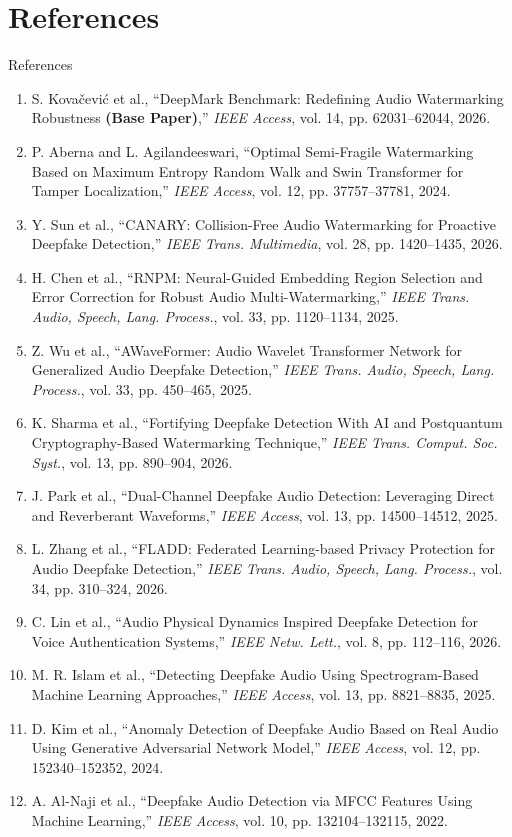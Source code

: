 \documentclass[10pt, aspectratio=169]{beamer}
\begin{document}
\section{References}
\begin{frame}{References}
  \fontsize{5.5pt}{7pt}\selectfont
  \setlength{\leftmargini}{1.2em}
  \begin{enumerate}
    \setlength{\itemsep}{1.5pt}
    \setlength{\parskip}{0pt}
    \item S. Kova\v{c}evi\'c et al., ``DeepMark Benchmark: Redefining Audio Watermarking Robustness \textbf{(Base Paper)},'' \textit{IEEE Access}, vol. 14, pp. 62031--62044, 2026.
    \item P. Aberna and L. Agilandeeswari, ``Optimal Semi-Fragile Watermarking Based on Maximum Entropy Random Walk and Swin Transformer for Tamper Localization,'' \textit{IEEE Access}, vol. 12, pp. 37757--37781, 2024.
    \item Y. Sun et al., ``CANARY: Collision-Free Audio Watermarking for Proactive Deepfake Detection,'' \textit{IEEE Trans. Multimedia}, vol. 28, pp. 1420--1435, 2026.
    \item H. Chen et al., ``RNPM: Neural-Guided Embedding Region Selection and Error Correction for Robust Audio Multi-Watermarking,'' \textit{IEEE Trans. Audio, Speech, Lang. Process.}, vol. 33, pp. 1120--1134, 2025.
    \item Z. Wu et al., ``AWaveFormer: Audio Wavelet Transformer Network for Generalized Audio Deepfake Detection,'' \textit{IEEE Trans. Audio, Speech, Lang. Process.}, vol. 33, pp. 450--465, 2025.
    \item K. Sharma et al., ``Fortifying Deepfake Detection With AI and Postquantum Cryptography-Based Watermarking Technique,'' \textit{IEEE Trans. Comput. Soc. Syst.}, vol. 13, pp. 890--904, 2026.
    \item J. Park et al., ``Dual-Channel Deepfake Audio Detection: Leveraging Direct and Reverberant Waveforms,'' \textit{IEEE Access}, vol. 13, pp. 14500--14512, 2025.
    \item L. Zhang et al., ``FLADD: Federated Learning-based Privacy Protection for Audio Deepfake Detection,'' \textit{IEEE Trans. Audio, Speech, Lang. Process.}, vol. 34, pp. 310--324, 2026.
    \item C. Lin et al., ``Audio Physical Dynamics Inspired Deepfake Detection for Voice Authentication Systems,'' \textit{IEEE Netw. Lett.}, vol. 8, pp. 112--116, 2026.
    \item M. R. Islam et al., ``Detecting Deepfake Audio Using Spectrogram-Based Machine Learning Approaches,'' \textit{IEEE Access}, vol. 13, pp. 8821--8835, 2025.
    \item D. Kim et al., ``Anomaly Detection of Deepfake Audio Based on Real Audio Using Generative Adversarial Network Model,'' \textit{IEEE Access}, vol. 12, pp. 152340--152352, 2024.
    \item A. Al-Naji et al., ``Deepfake Audio Detection via MFCC Features Using Machine Learning,'' \textit{IEEE Access}, vol. 10, pp. 132104--132115, 2022.
  \end{enumerate}
\end{frame}
\end{document}
